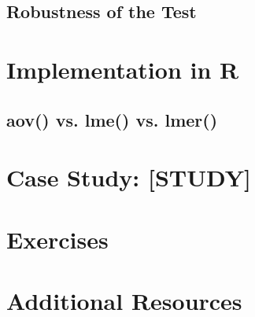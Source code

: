 \subsection{Robustness of the Test}

\section{Implementation in R}

\subsection{aov() vs. lme() vs. lmer()}

\section{Case Study: [STUDY]}

\section{Exercises}

\section{Additional Resources}

